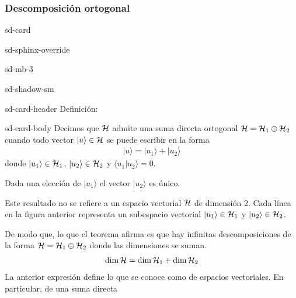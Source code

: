 \documentclass[letterpaper,10pt,english]{jupyterBook}
\newcommand{\ket}[1]{|#1\rangle}
\newcommand{\braket}[2]{\langle #1|#2\rangle}
\newcommand{\Hil}{{\cal H}}
\begin{document}
\subsubsection{Descomposición ortogonal}
\label{\detokenize{docs/Part_01_Formalismo/Chapter_01_02_Formalismo_matem_xe1tico/01_02_Vectores_myst:descomposicion-ortogonal}}
\begin{sphinxuseclass}{sd-card}
\begin{sphinxuseclass}{sd-sphinx-override}
\begin{sphinxuseclass}{sd-mb-3}
\begin{sphinxuseclass}{sd-shadow-sm}
\begin{sphinxuseclass}{sd-card-header}
\sphinxAtStartPar
Definición:

\end{sphinxuseclass}
\begin{sphinxuseclass}{sd-card-body}
\sphinxAtStartPar
Decimos que \(\Hil\) admite una suma directa ortogonal \(\Hil = \Hil_1 \oplus \Hil_2\) cuando todo vector \(\ket{u}\in \Hil\) se puede escribir en la forma
\begin{equation*}
\begin{split}
\ket{u} = \ket{u_1} + \ket{u_2} 
\end{split}
\end{equation*}
\sphinxAtStartPar
donde \(\ket{u_1}\in \Hil_1\), \(\ket{u_2}\in \Hil_2\) y \(\braket{u_1}{u_2} = 0\).

\end{sphinxuseclass}
\end{sphinxuseclass}
\end{sphinxuseclass}
\end{sphinxuseclass}
\end{sphinxuseclass}
\sphinxAtStartPar
Dada una elección de  \(\ket{u_1}\) el vector \(\ket{u_2}\) es único.

\sphinxAtStartPar
Este resultado no se refiere a un espacio vectorial \(\Hil\) de dimensión 2. Cada línea en la figura anterior representa  un subespacio vectorial \(\ket{u_1} \in \Hil_1\) y \(\ket{u_2}\in \Hil_2\).

\sphinxAtStartPar
De modo que,  lo que el teorema afirma es que hay infinitas descomposiciones de la forma \(\Hil = \Hil_1\oplus \Hil_2\) donde las dimensiones se suman.
\begin{equation*}
\begin{split}
\hbox{dim}\,\Hil = \hbox{dim}\,\Hil_1  + \hbox{dim}\,\Hil_2  
\end{split}
\end{equation*}
\sphinxAtStartPar
La anterior expresión define lo que se conoce como  de espacios vectoriales. En particular, de una suma directa 
\end{document}
